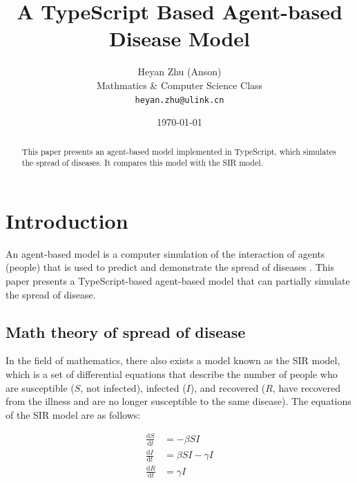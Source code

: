 \documentclass[12pt]{article}
\title{A TypeScript Based Agent-based Disease Model}
\author{Heyan Zhu (Anson)\\
\footnotesize Mathmatics \& Computer Science Class\\
\footnotesize \texttt{heyan.zhu@ulink.cn}}
\date{\today}
\begin{document}
\maketitle

\begin{abstract}
This paper presents an agent-based model implemented in TypeScript, which simulates the spread of diseases. It compares this model with the SIR model.
\end{abstract}

\newcommand{\md}{\mathrm{d}}

\section{Introduction}
An agent-based model is a computer simulation of the interaction of agents (people) that is used to predict and demonstrate the spread of diseases \cite{columbiaGeneral}. This paper presents a TypeScript-based agent-based model that can partially simulate the spread of disease.

\subsection{Math theory of spread of disease}
In the field of mathematics, there also exists a model known as the SIR model, which is a set of differential equations that describe the number of people who are susceptible ($S$, not infected), infected ($I$), and recovered ($R$, have recovered from the illness and are no longer susceptible to the same disease). The equations of the SIR model are as follows:

\begin{align}
    \frac{\md S}{\md t}&=-\beta S I\\
    \frac{\md I}{\md t}&=\beta S I-\gamma I\\
    \frac{\md R}{\md t}&=\gamma I
\end{align}
\end{document}
